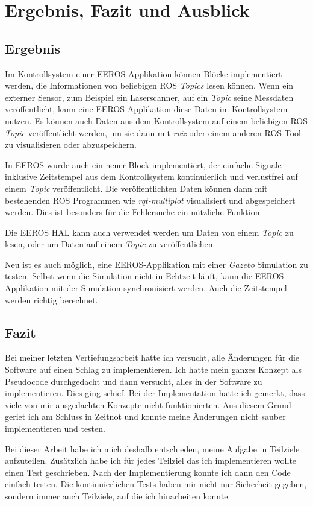 \chapter{Ergebnis, Fazit und Ausblick}
\section{Ergebnis}
Im Kontrollsystem einer EEROS Applikation können Blöcke implementiert werden, die Informationen von beliebigen ROS \textit{Topics} lesen können.
Wenn ein externer Sensor, zum Beispiel ein Laserscanner, auf ein \textit{Topic} seine Messdaten veröffentlicht, kann eine EEROS Applikation diese Daten im Kontrollsystem nutzen.
Es können auch Daten aus dem Kontrollsystem auf einem beliebigen ROS \textit{Topic} veröffentlicht werden, um sie dann mit \textit{rviz} oder einem anderen ROS Tool zu visualisieren oder abzuspeichern.

In EEROS wurde auch ein neuer Block implementiert, der einfache Signale inklusive Zeitstempel aus dem Kontrollsystem kontinuierlich und verlustfrei auf einem \textit{Topic} veröffentlicht.
Die veröffentlichten Daten können dann mit bestehenden ROS Programmen wie \textit{rqt-multiplot} visualisiert und abgespeichert werden.
Dies ist besonders für die Fehlersuche ein nützliche Funktion.

Die EEROS HAL kann auch verwendet werden um Daten von einem \textit{Topic} zu lesen, oder um Daten auf einem \textit{Topic} zu veröffentlichen.

Neu ist es auch möglich, eine EEROS-Applikation mit einer \textit{Gazebo} Simulation zu testen.
Selbst wenn die Simulation nicht in Echtzeit läuft, kann die EEROS Applikation mit der Simulation synchronisiert werden.
Auch die Zeitstempel werden richtig berechnet.


\section{Fazit}	%
Bei meiner letzten Vertiefungsarbeit hatte ich versucht, alle Änderungen für die Software auf einen Schlag zu implementieren.
Ich hatte mein ganzes Konzept als Pseudocode durchgedacht und dann versucht, alles in der Software zu implementieren.
Dies ging schief.
Bei der Implementation hatte ich gemerkt, dass viele von mir ausgedachten Konzepte nicht funktionierten.
Aus diesem Grund geriet ich am Schluss in Zeitnot und konnte meine Änderungen nicht sauber implementieren und testen.

Bei dieser Arbeit habe ich mich deshalb entschieden, meine Aufgabe in Teilziele aufzuteilen.
Zusätzlich habe ich für jedes Teilziel das ich implementieren wollte einen Test geschrieben.
Nach der Implementierung konnte ich dann den Code einfach testen.
Die kontinuierlichen Tests haben mir nicht nur Sicherheit gegeben, sondern immer auch Teilziele, auf die ich hinarbeiten konnte.

